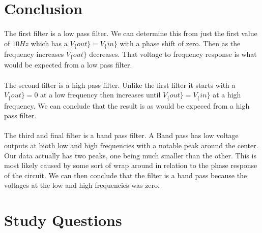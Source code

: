\documentclass{article}
\begin{document}
\clearpage

\section*{Conclusion}
\paragraph{}
The first filter is a low pass filter. We can determine this from just the first value of $10Hz$ which has a 
$V_\{out\} = V_\{in\}$ with a phase shift of zero. Then as the frequency increases $V_\{out\}$ decreases. That
voltage to frequency response is what would be expected from a low pass filter.
\paragraph{}
The second filter is a high pass filter. Unlike the first filter it starts with a $V_\{out\} = 0$ at a low frequency
 then increases until $V_\{out\} = V_\{in\}$ at a high frequency. We can conclude that the result is as would be 
 expeced from a high pass filter.
 \paragraph{}
 The third and final filter is a band pass filter. A Band pass has low voltage outputs at bioth low and high frequencies 
 with a notable peak around the center. Our data actually has two peaks, one being much smaller than the other. This 
 is most likely caused by some sort of wrap around in relation to the phase response of the circuit. We can then conclude
 that the filter is a band pass because the voltages at the low and high frequencies was zero.

\section*{Study Questions}
\end{document}
